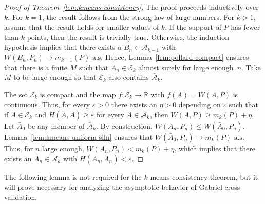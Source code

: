 \documentclass[11pt]{article}
\newcommand{\R}{\mathbb{R}}
\newcommand{\sA}{\mathcal{A}}
\newcommand{\sbA}{\mathcal{\bar A}}
\newcommand{\sE}{\mathcal{E}}
\begin{document}
\begin{proof}[Proof of Theorem~\ref{lem:kmeans-consistency}]
The proof proceeds inductively over $k$.  For $k=1$, the result follows from
the strong law of large numbers.  For $k > 1$, assume that the result holds
for smaller values of $k$.  If the support of $P$ has fewer than $k$ points,
then the result is trivially true.  Otherwise, the induction hypothesis
implies that there exists a $B_n \in \sA_{k-1}$ with $W(B_n, P_n) \to
m_{k-1}(P)\text{ a.s.}$  Hence, Lemma~\ref{lem:pollard-compact} ensures that
there is a finite $M$ such that $A_n \in \sE_k$ almost surely for large
enough~$n$.  Take $M$ to be large enough so that $\sE_k$ also contains
$\sbA_k$.


The set $\sE_k$ is compact and the map $f: \sE_k \to \R$ with $f(A) =
W(A, P)$ is continuous.  Thus, for every $\varepsilon > 0$ there exists an
$\eta > 0$ depending on $\varepsilon$ such that if $A \in \sE_k$ and $H(A,
\bar A) \geq \varepsilon$ for every $\bar A \in \sbA_k$, then $W(A,P) \geq
m_{k}(P) + \eta$.  Let $\bar A_0$ be any member of $\sbA_k$.  By construction,
$W(A_n, P_n) \leq W(\bar A_0, P_n)$.  Lemma~\ref{lem:kmeans-uniform-slln}
ensures that $W(\bar A_0, P_n) \to m_k(P)\text{ a.s.}$  Thus, for $n$ large
enough, $W(A_n, P_n) < m_{k}(P) + \eta$, which implies that there exists an
$\bar A_n \in \sbA_k$ with $H(A_n, \bar A_n) < \varepsilon$.
\end{proof}


The following lemma is not required for the $k$-means consistency theorem, but
it will prove necessary for analyzing the asymptotic behavior of Gabriel
cross-validation.
\end{document}
